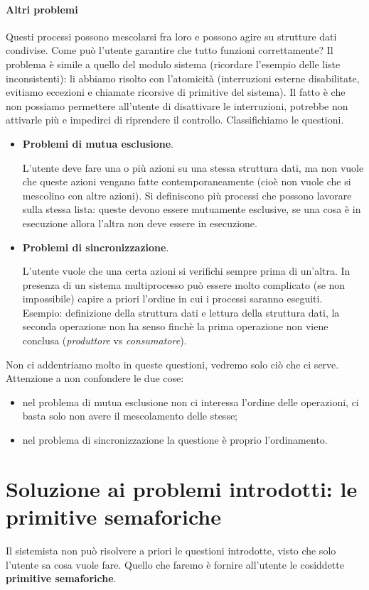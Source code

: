 \documentclass[11pt]{report}
\theoremstyle{definition}
\begin{document}
\paragraph{Altri problemi} Questi processi possono mescolarsi fra loro e possono agire su strutture dati condivise. Come può l'utente garantire che tutto funzioni correttamente? Il problema è simile a quello del modulo sistema (ricordare l'esempio delle liste inconsistenti): li abbiamo risolto con l'atomicità (interruzioni esterne disabilitate, evitiamo eccezioni e chiamate ricorsive di primitive del sistema). Il fatto è che non possiamo permettere all'utente di disattivare le interruzioni, potrebbe non attivarle più e impedirci di riprendere il controllo. Classifichiamo le questioni.
\begin{itemize}
	\item \textbf{Problemi di mutua esclusione}.
	
	L'utente deve fare una o più azioni su una stessa struttura dati, ma non vuole che queste azioni vengano fatte contemporaneamente (cioè non vuole che si mescolino con altre azioni). Si definiscono più processi che possono lavorare sulla stessa lista: queste devono essere mutuamente esclusive, se una cosa è in esecuzione allora l'altra non deve essere in esecuzione.
	
	\item \textbf{Problemi di sincronizzazione}.
	
	 L'utente vuole che una certa azioni si verifichi sempre prima di un'altra. In presenza di un sistema multiprocesso può essere molto complicato (se non impossibile) capire a priori l'ordine in cui i processi saranno eseguiti. Esempio: definizione della struttura dati e lettura della struttura dati, la seconda operazione non ha senso finchè la prima operazione non viene conclusa (\emph{produttore} vs \emph{consumatore}).
\end{itemize}
Non ci addentriamo molto in queste questioni, vedremo solo ciò che ci serve. Attenzione a non confondere le due cose:
\begin{itemize}
	\item nel problema di mutua esclusione non ci interessa l'ordine delle operazioni, ci basta solo non avere il mescolamento delle stesse;
	\item nel problema di sincronizzazione la questione è proprio l'ordinamento.
\end{itemize}

\section{Soluzione ai problemi introdotti: le primitive semaforiche} 
Il sistemista non può risolvere a priori le questioni introdotte, visto che solo l'utente sa cosa vuole fare. Quello che faremo è fornire all'utente le cosiddette \textbf{primitive semaforiche}.
\end{document}
